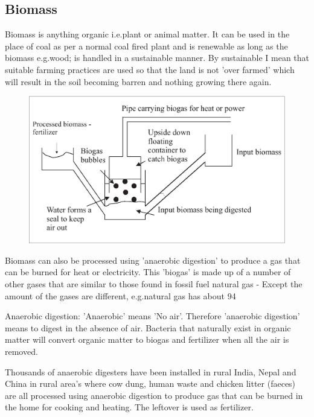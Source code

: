 \subsection*{Biomass}

Biomass is anything organic i.e.\@ plant or animal matter. It can be
used in the place of coal as per a normal coal fired plant and is
renewable as long as the biomass e.g.\@ wood; is handled in a
sustainable manner. By sustainable I mean that suitable farming
practices are used so that the land is not 'over farmed' which will
result in the soil becoming barren and nothing growing there again.

\begin{figure}[H]
\centering
\includegraphics[scale=0.4]{../../epsimages/6biogas.eps}
\end{figure}

Biomass can also be processed using 'anaerobic digestion' to produce a gas that can be burned for heat or electricity. This 'biogas' is made up of a number of other gases that are similar to those found in fossil fuel natural gas - Except the amount of the gases are different, e.g.\@ natural gas has about 94%

Anaerobic digestion: 'Anaerobic' means 'No air'. Therefore
'anaerobic digestion' means to digest in the absence of air.
Bacteria that naturally exist in organic matter will convert organic
matter to biogas and fertilizer when all the air is removed.

Thousands of anaerobic digesters have been installed in rural India,
Nepal and China in rural area's where cow dung, human waste and
chicken litter (faeces) are all processed using anaerobic digestion
to produce gas that can be burned in the home for cooking and
heating. The leftover is used as fertilizer.


